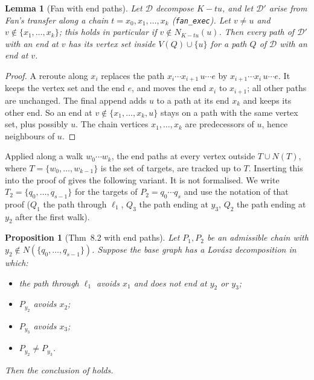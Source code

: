 \documentclass[11pt]{amsart}
\newtheorem{lemma}[theorem]{Lemma}
\newtheorem{proposition}[theorem]{Proposition}
\theoremstyle{definition}
\newcommand{\cD}{\mathcal D}
\begin{document}
\begin{lemma}[Fan with end paths]\label{lem:fanend}
Let $\cD$ decompose $K-tu$, and let $\cD'$ arise from Fan's transfer along a chain
$t=x_0,x_1,\dots,x_k$ (\texttt{fan\_exec}). Let $v\ne u$ and $v\notin\{x_1,\dots,x_k\}$; this
holds in particular if $v\notin N_{K-tu}(u)$. Then every path of $\cD'$ with an end at $v$ has
its vertex set inside $V(Q)\cup\{u\}$ for a path $Q$ of $\cD$ with an end at $v$.
\end{lemma}

\begin{proof}
A reroute along $x_i$ replaces the path $x_i\cdots x_{i+1}\,u\cdots e$ by
$x_{i+1}\cdots x_i\,u\cdots e$. It keeps the vertex set and the end $e$, and moves the end $x_i$
to $x_{i+1}$; all other paths are unchanged. The final append adds $u$ to a path at its end
$x_k$ and keeps its other end. So an end at $v\notin\{x_1,\dots,x_k,u\}$ stays on a path with the
same vertex set, plus possibly $u$. The chain vertices $x_1,\dots,x_k$ are predecessors of $u$,
hence neighbours of $u$.
\end{proof}

Applied along a walk $w_0\cdots w_k$, the end paths at every vertex outside
$T\cup N(T)$, where $T=\{w_0,\dots,w_{k-1}\}$ is the set of targets, are tracked up to $T$.
Inserting this into the proof of \cite[Thm~8.2]{TM} gives the following variant. It is not
formalised. We write $T_2=\{q_0,\dots,q_{s-1}\}$ for the targets of $P_2=q_0\cdots q_s$ and use
the notation of that proof ($Q_1$ the path through $\ell_1$, $Q_3$ the path ending at $y_3$, $Q_2$
the path ending at $y_2$ after the first walk).

\begin{proposition}[Thm~8.2 with end paths]\label{prop:ep}
Let $P_1,P_2$ be an admissible chain \cite[Def.~8.1]{TM} with $y_2\notin N(\{q_0,\dots,q_{s-1}\})$.
Suppose the base graph has a Lov\'asz decomposition in which:
\begin{itemize}
\item the path through $\ell_1$ avoids $x_1$ and does not end at $y_2$ or $y_3$;
\item $P_{y_2}$ avoids $x_2$;
\item $P_{y_3}$ avoids $x_3$;
\item $P_{y_2}\ne P_{y_3}$.
\end{itemize}
Then the conclusion of \cite[Thm~8.2]{TM} holds.
\end{proposition}
\end{document}
